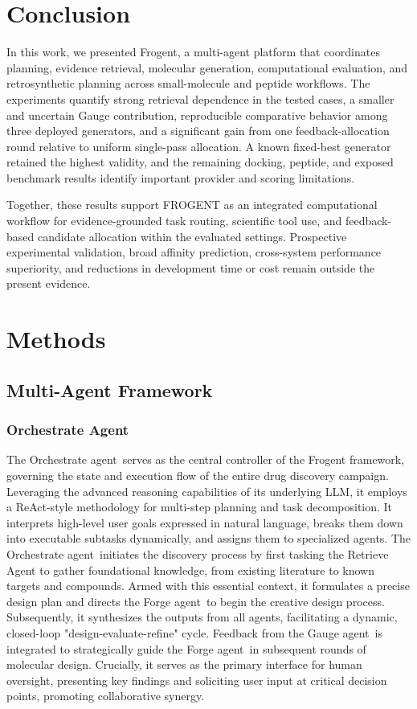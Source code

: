 \documentclass{article}
\newcommand{\name}{Frogent }
\newcommand{\nam}{Frogent}
\newcommand{\oa}{Orchestrate agent}
\newcommand{\fa}{Forge agent}
\newcommand{\ga}{Gauge agent}
\begin{document}
\section*{Conclusion}
In this work, we presented \nam, a multi-agent platform that coordinates planning, evidence retrieval, molecular generation, computational evaluation, and retrosynthetic planning across small-molecule and peptide workflows. The experiments quantify strong retrieval dependence in the tested cases, a smaller and uncertain Gauge contribution, reproducible comparative behavior among three deployed generators, and a significant gain from one feedback-allocation round relative to uniform single-pass allocation. A known fixed-best generator retained the highest validity, and the remaining docking, peptide, and exposed benchmark results identify important provider and scoring limitations.

Together, these results support FROGENT as an integrated computational workflow for evidence-grounded task routing, scientific tool use, and feedback-based candidate allocation within the evaluated settings. Prospective experimental validation, broad affinity prediction, cross-system performance superiority, and reductions in development time or cost remain outside the present evidence.

\section*{Methods}

\subsection*{Multi-Agent Framework}
\label{sec:framework}

\subsubsection*{Orchestrate Agent}
The \oa \ serves as the central controller of the \name  framework, governing the state and execution flow of the entire drug discovery campaign. Leveraging the advanced reasoning capabilities of its underlying LLM, it employs a ReAct-style \cite{yao2023react} methodology for multi-step planning and task decomposition. It interprets high-level user goals expressed in natural language, breaks them down into executable subtasks dynamically, and assigns them to specialized agents. The \oa \ initiates the discovery process by first tasking the Retrieve Agent to gather foundational knowledge, from existing literature to known targets and compounds. Armed with this essential context, it formulates a precise design plan and directs the \fa \ to begin the creative design process. Subsequently, it synthesizes the outputs from all agents, facilitating a dynamic, closed-loop  "design-evaluate-refine" cycle. Feedback from the \ga \ is integrated to strategically guide the \fa \ in subsequent rounds of molecular design. Crucially, it serves as the primary interface for human oversight, presenting key findings and soliciting user input at critical decision points, promoting collaborative synergy.
\end{document}
